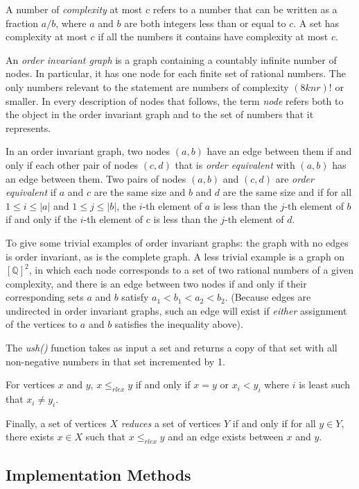 \documentclass[11pt]{article}
\begin{document}
A number of \emph{complexity} at most $c$ refers to a number that can be written as a fraction $a/b$, where $a$ and $b$ are both integers less than or equal to $c$. A set has complexity at most $c$ if all the numbers it contains have complexity at most $c$.  

An \emph{order invariant graph} is a graph containing a countably infinite number of nodes. In particular, it has one node for each finite set of rational numbers. The only numbers relevant to the statement are numbers of complexity $(8knr)!$ or smaller. In every description of nodes that follows, the term \emph{node} refers both to the object in the order invariant graph and to the set of numbers that it represents. 

In an order invariant graph, two nodes $(a,b)$ have an edge between them if and only if each other pair of nodes $(c,d)$ that is \emph{order equivalent} with $(a,b)$ has an edge between them. Two pairs of nodes $(a, b)$ and $(c, d)$ are \emph{order equivalent} if $a$ and $c$ are the same size and $b$ and $d$ are the same size and if for all $1 \le i \le |a|$ and $1 \le j \le |b|$, the $i$-th element of $a$ is less than the $j$-th element of $b$ if and only if the $i$-th element of $c$ is less than the $j$-th element of $d$. 

To give some trivial examples of order invariant graphs: the graph with no edges is order invariant, as is the complete graph. A less trivial example is a graph on $[\mathbb{Q}]^2$, in which each node corresponds to a set of two rational numbers of a given complexity, and there is an edge between two nodes if and only if their corresponding sets $a$ and $b$ satisfy $a_1 < b_1 < a_2 < b_2$. (Because edges are undirected in order invariant graphs, such an edge will exist if \emph{either} assignment of the vertices to $a$ and $b$ satisfies the inequality above). 

The \emph{ush()} function takes as input a set and returns a copy of that set with all non-negative numbers in that set incremented by 1. 

For vertices $x$ and $y$, $x \le_{rlex} y$ if and only if $x = y$ or $x_i < y_i$ where $i$ is least such that $x_i \not= y_i$.

Finally, a set of vertices $X$ \emph{reduces} a set of vertices $Y$ if and only if for all $y \in Y$, there exists $x \in X$ such that $x \le_{rlex} y$ and an edge exists between $x$ and $y$. 

\subsection{Implementation Methods}
\end{document}
